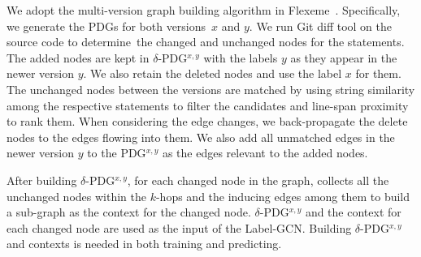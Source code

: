 
We adopt the multi-version graph building algorithm in
Flexeme~\cite{flexeme-fse20}. Specifically, we generate the PDGs
for both versions~$x$ and $y$. We run Git diff tool on the source
code to determine~the changed and unchanged nodes for the
statements. The added nodes are kept in $\delta$-PDG$^{x,y}$ with the
labels $y$ as they appear in the newer version $y$. We also retain the
deleted nodes and use the label $x$ for them. The unchanged nodes
between the versions are matched by using string similarity among the
respective statements to filter the candidates and line-span proximity
to rank them. When considering the edge changes, we back-propagate the
delete nodes to the edges flowing into them. We also add all unmatched
edges in the newer version $y$ to the PDG$^{x,y}$ as the edges
relevant to the added nodes.




After building $\delta$-PDG$^{x,y}$, for each changed node in the
graph, \tool collects all the unchanged nodes within the $k$-hops and
the inducing edges among them to build a sub-graph as the context for
the changed node. $\delta$-PDG$^{x,y}$ and the context for each
changed node are used as the input of the Label-GCN. Building
$\delta$-PDG$^{x,y}$ and contexts is needed in both training and
predicting.

